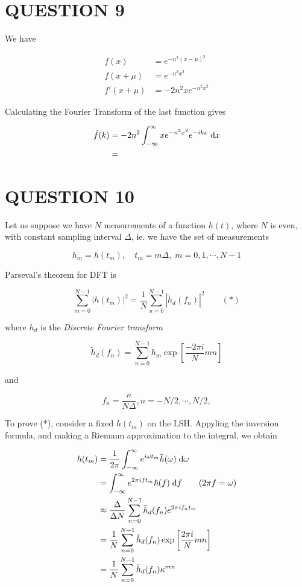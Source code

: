 \documentclass[a4paper]{article}
\begin{document}
\section{QUESTION 9}

We have

\begin{align*}
f(x) & = e^{-n^{2}(x - \mu)^{2}} \\
f(x + \mu) & = e^{-n^{2}x^{2}} \\
f'(x +  \mu) & = -2n^{2} xe^{-n^{2}x^{2}}  
\end{align*}

Calculating the Fourier Transform of the last function gives

\begin{align*}
\tilde{f}(k) & = -2n^{2} \int_{-\infty}^{\infty}  xe^{-n^{2}x^{2}}   e^{-ikx} \; \mathrm{d} x  \\
& = 
\end{align*}

\section{QUESTION 10}


Let us suppose we have $ N $ measurements of a function $ h(t) $, where $ N $ is even, with constant sampling interval $ \Delta $, ie. we have the set of measurements

\[ h_{m} = h(t_{m}), \quad t_{m} = m \Delta, \; m = 0,1,\cdots,N-1 \]

Parseval's theorem for DFT is

\[ \sum_{m=0}^{N-1} | h(t_{m}) |^{2} = \frac{1}{N} \sum_{n=0}^{N-1} | \tilde{h}_{d}(f_{n}) |^{2} \qquad (*) \]

where $ h_{d} $ is the \emph{Discrete Fourier transform} 

\[ \tilde{h}_{d}(f_{n}) = \sum_{n=0}^{N-1} h_{m} \exp\left[ \frac{-2\pi i}{N} mn \right]   \]

and 

\[ f_{n} = \frac{n}{N \Delta}, n = -N / 2,\cdots,N/2,  \]

To prove (*), consider a fixed $ h(t_{m}) $ on the LSH. Appyling the inversion formula, and making a Riemann approximation to the integral, we obtain

\begin{align*}
h(t_{m}) & = \frac{1}{2\pi} \int_{-\infty}^{\infty} e^{i \omega t_{m}} \tilde{h}(\omega) \; \mathrm{d} \omega  \\
& = \int_{-\infty}^{\infty} e^{2 \pi i f t_{m}} \hbar(f) \; \mathrm{d} f  \qquad  ( 2\pi f = \omega)\\
& \approx \frac{\Delta}{\Delta N} \sum_{n=0}^{N-1} \tilde{h}_{d} (f_{n}) e^{2 \pi i f_{n} t_{m}} \\
& = \frac{1}{N} \sum_{n=0}^{N-1} \tilde{h}_{d}(f_{n}) \exp \left[  \frac{2 \pi i}{N} mn \right] \\
& = \frac{1}{N} \sum_{n=0}^{N-1} \tilde{h}_{d}(f_{n}) \kappa^{mn}
\end{align*}
\end{document}
